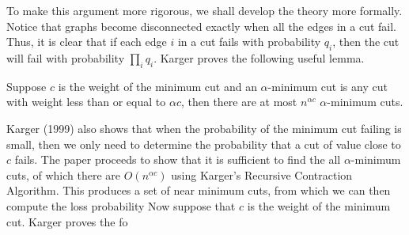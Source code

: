 \documentclass{article}
\theoremstyle{plain}
\begin{document}
To make this argument more rigorous, we shall develop the theory more formally. Notice that graphs become disconnected exactly when all the edges in a cut fail. Thus, it is clear that if each edge $i$ in a cut fails with probability $q_i$, then the cut will fail with probability $\prod_i q_i$. Karger proves the following useful lemma.

\begin{lemma}
  Suppose $c$ is the weight of the minimum cut and an $\alpha$-minimum cut is any cut with weight less than or equal to $\alpha c$, then there are at most $n^{\alpha c}$ $\alpha$-minimum cuts.
\end{lemma}

Karger (1999) also shows that when the probability of the minimum cut failing is small, then we only need to determine the probability that a cut of value close to $c$ fails. The paper proceeds to show that it is sufficient to find the all $\alpha$-minimum cuts, of which there are $O(n^{\alpha c})$ using Karger's Recursive Contraction Algorithm. This produces a set of near minimum cuts, from which we can then compute the loss probability
Now suppose that $c$ is the weight of the minimum cut. Karger proves the fo
\end{document}
